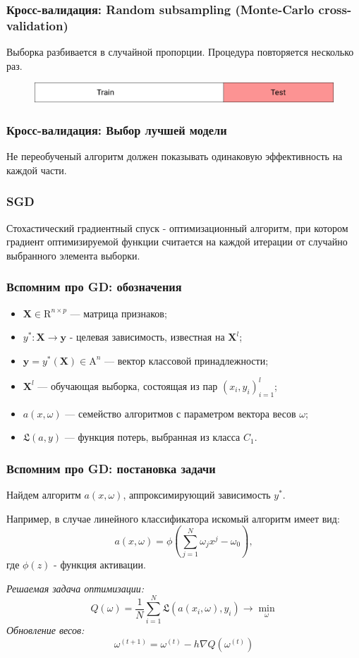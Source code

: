 \documentclass[11pt]{beamer}
\begin{document}
	\begin{frame}
		\frametitle{Кросс-валидация: Random subsampling (Monte-Carlo cross-validation)}
		Выборка разбивается в случайной пропорции. Процедура повторяется несколько раз.
		\begin{figure}
			\includegraphics[width=1\linewidth]{imgs/completecrossvalidation}
		\end{figure}
	\end{frame}
	
	\begin{frame}
		\frametitle{Кросс-валидация: Выбор лучшей модели}
		Не переобученый алгоритм должен показывать одинаковую эффективность на каждой части.
		
	\end{frame}

	\begin{frame}
		\frametitle{SGD}
		Стохастический градиентный спуск - оптимизационный алгоритм, при котором градиент оптимизируемой функции считается на каждой итерации от случайно выбранного элемента выборки.
	\end{frame}
	\begin{frame}
		\frametitle{Вспомним про GD: обозначения}
		\begin{itemize}
			\item $ \bm{X} \in \mathrm{R}^{n\times p} $ --- матрица признаков;
			\item $ y^*:\bm{X}\rightarrow\bm{y} $ - целевая зависимость, известная на $ \bm{X}^l $;
			\item $ \bm{y} = y^*(\bm{X}) \in  \mathrm{A}^n $ --- вектор классовой принадлежности;
			\item $ \bm{X}^l $ --- обучающая выборка, состоящая из пар $ (x_i, y_i)_{i=1}^l $;
			\item $ a(x, \omega) $ --- семейство алгоритмов с параметром вектора весов $ \omega $;
			\item $ \mathfrak{L}(a, y) $ --- функция потерь, выбранная из класса $ C_1 $.
			
		\end{itemize}
		
	\end{frame}
	
	\begin{frame}
		\frametitle{Вспомним про GD: постановка задачи}
		Найдем алгоритм $ a(x, \omega) $, аппроксимирующий зависимость $ y^* $.
		
		Например, в случае линейного классификатора искомый алгоритм имеет вид:
		$$ a(x, \omega) = \phi(\sum\limits_{j=1}^N \omega_jx^j - \omega_0), $$где $ \phi(z) $ - функция активации. 
		
		\textit{Решаемая задача оптимизации:}
		$$ Q(\omega) = \frac{1}{N}\sum\limits_{i=1}^{N}\mathfrak{L}(a(x_i, \omega), y_i)\rightarrow\min\limits_{\omega} $$
		\textit{Обновление весов:}
		$$ \omega^{(t+1)} = \omega^{(t)} - h\nabla Q(\omega^{(t)}) $$
		
	\end{frame}
\end{document}
